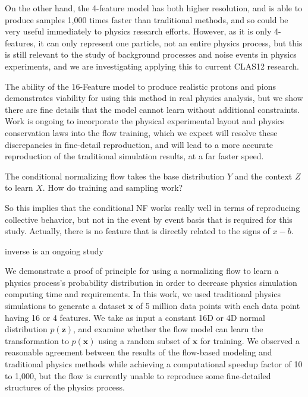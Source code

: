         On the other hand, the 4-feature model has both higher resolution, and is able to produce samples 1,000 times faster than traditional methods, and so could be very useful immediately to physics research efforts. However, as it is only 4-features, it can only represent one particle, not an entire physics process, but this is still relevant to the study of background processes and noise events in physics experiments, and we are investigating applying this to current CLAS12 research.
        
        The ability of the 16-Feature model to produce realistic protons and pions demonstrates viability for using this method in real physics analysis, but we show there are fine details that the model cannot learn without additional constraints. Work is ongoing to incorporate the physical experimental layout and physics conservation laws into the flow training, which we expect will resolve these discrepancies in fine-detail reproduction, and will lead to a more accurate reproduction of the traditional simulation results, at a far faster speed. 

    The conditional normalizing flow takes the base distribution $Y$ and the context $Z$ to learn $X$. How do training and sampling work? 


So this implies that the conditional NF works really well in terms of reproducing collective behavior, but not in the event by event basis that is required for this study. Actually, there is no feature that is directly related to the signs of $x-b$.
    
    
    
    inverse is an ongoing study
    
    We demonstrate a proof of principle for using a normalizing flow to learn a physics process's probability distribution in order to decrease physics simulation computing time and requirements. In this work, we used traditional physics simulations to generate a dataset $\mathbf{x}$ of 5 million data points with each data point having 16 or 4 features.  We take as input a constant 16D or 4D normal distribution $p(\mathbf{z})$, and examine whether the flow model can learn the transformation to $p(\mathbf{x})$ using a random subset of $\mathbf{x}$ for training. We observed a reasonable agreement between the results of the flow-based modeling and traditional physics methods while achieving a computational speedup factor of 10 to 1,000, but the flow is currently unable to reproduce some fine-detailed structures of the physics process.
    
